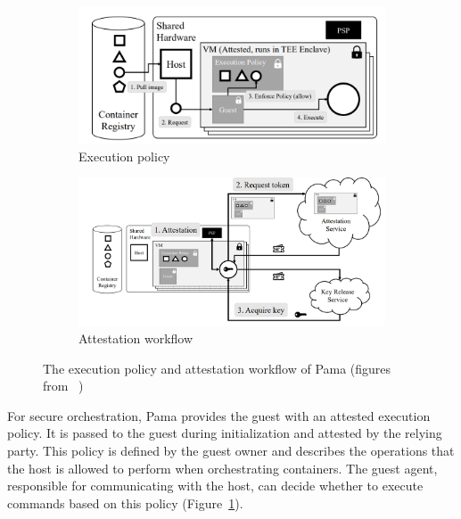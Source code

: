 \begin{figure}[htp]
    \centering
    \begin{subfigure}[b]{0.45\textwidth}
        \centering
        \includegraphics[width=\textwidth]{images/pama_policy.png}
        \caption{Execution policy}
        \label{fig:pama_policy}
    \end{subfigure}
    \hfill
    \begin{subfigure}[b]{0.45\textwidth}
        \centering
        \includegraphics[width=\textwidth]{images/pama_atte.png}
        \caption{Attestation workflow}
        \label{fig:pama_atte}
    \end{subfigure}
    \hfill
       \caption[The execution policy and attestation workflow of Pama]{The execution policy and attestation workflow of Pama (figures from~\cite*{Johnson2023ParmaCC} )}
       \label{fig:pama}
\end{figure}

For secure orchestration, Pama provides the guest with an attested execution policy. It is passed to the guest during initialization and attested by the relying party. This policy is defined by the guest owner and describes the operations that the host is allowed to perform when orchestrating 
containers. The guest agent, responsible for communicating with the host, can decide whether to execute commands based on this policy (Figure~\ref{fig:pama_policy}).  


